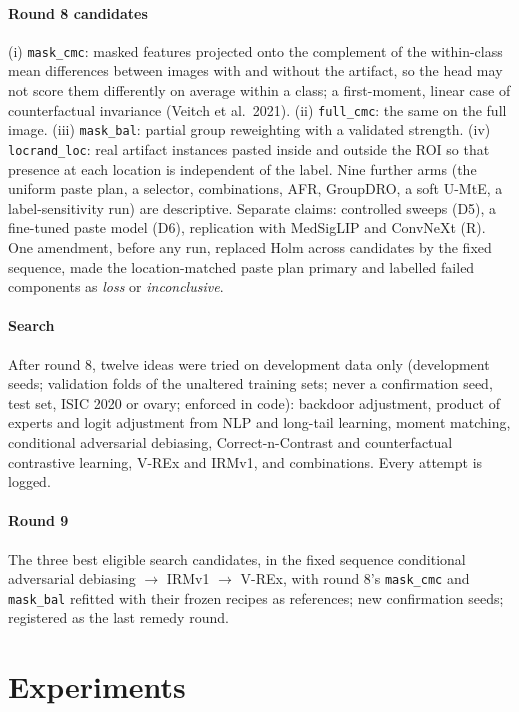 \paragraph{Round 8 candidates} (i) \texttt{mask\_cmc}: masked features projected onto the complement of the within-class
mean differences between images with and without the artifact, so the head may not score them differently on average
within a class; a first-moment, linear case of counterfactual invariance (Veitch et al.\ 2021). (ii) \texttt{full\_cmc}:
the same on the full image. (iii) \texttt{mask\_bal}: partial group reweighting with a validated strength. (iv)
\texttt{locrand\_loc}: real artifact instances pasted inside and outside the ROI so that presence at each location is
independent of the label. Nine further arms (the uniform paste plan, a selector, combinations, AFR, GroupDRO, a soft U-MtE, a label-sensitivity run) are descriptive.
Separate claims: controlled sweeps (D5), a fine-tuned paste model (D6), replication with MedSigLIP and ConvNeXt (R).
One amendment, before any run, replaced Holm across candidates by the fixed sequence, made the location-matched paste
plan primary and labelled failed components as \emph{loss} or \emph{inconclusive}.
\paragraph{Search} After round 8, twelve ideas were tried on development data only (development seeds; validation folds
of the unaltered training sets; never a confirmation seed, test set, ISIC 2020 or ovary; enforced in code): backdoor
adjustment, product of experts and logit adjustment from NLP and long-tail learning, moment matching, conditional
adversarial debiasing, Correct-n-Contrast and counterfactual contrastive learning, V-REx and IRMv1, and combinations.
Every attempt is logged.
\paragraph{Round 9} The three best eligible search candidates, in the fixed sequence conditional adversarial debiasing
$\to$ IRMv1 $\to$ V-REx, with round 8's \texttt{mask\_cmc} and \texttt{mask\_bal} refitted with their frozen recipes as
references; new confirmation seeds; registered as the last remedy round.

\section{Experiments}



